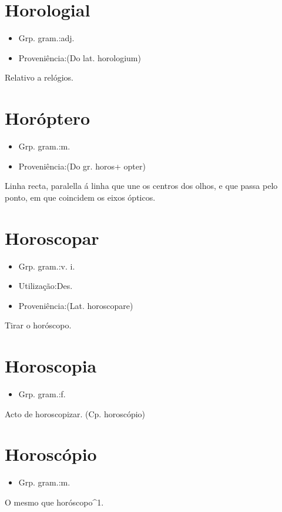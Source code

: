 \documentclass{article}
\begin{document}
\section{Horologial}
\begin{itemize}
\item {Grp. gram.:adj.}
\end{itemize}
\begin{itemize}
\item {Proveniência:(Do lat. \textunderscore horologium\textunderscore )}
\end{itemize}
Relativo a relógios.
\section{Horóptero}
\begin{itemize}
\item {Grp. gram.:m.}
\end{itemize}
\begin{itemize}
\item {Proveniência:(Do gr. \textunderscore horos\textunderscore  + \textunderscore opter\textunderscore )}
\end{itemize}
Linha recta, paralella á linha que une os centros dos olhos, e que passa pelo ponto, em que coincidem os eixos ópticos.
\section{Horoscopar}
\begin{itemize}
\item {Grp. gram.:v. i.}
\end{itemize}
\begin{itemize}
\item {Utilização:Des.}
\end{itemize}
\begin{itemize}
\item {Proveniência:(Lat. \textunderscore horoscopare\textunderscore )}
\end{itemize}
Tirar o horóscopo.
\section{Horoscopia}
\begin{itemize}
\item {Grp. gram.:f.}
\end{itemize}
Acto de horoscopizar.
(Cp. \textunderscore horoscópio\textunderscore )
\section{Horoscópio}
\begin{itemize}
\item {Grp. gram.:m.}
\end{itemize}
O mesmo que \textunderscore horóscopo\textunderscore ^1.
\end{document}
